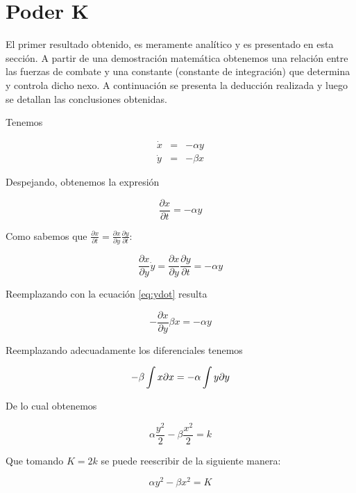 \documentclass{sig-alternate}
\begin{document}
\section{Poder K}

El primer resultado obtenido, es meramente analítico y es presentado en esta sección. A partir de una demostración matemática
obtenemos una relación entre las fuerzas de combate y una constante (constante de integración) que determina y controla dicho nexo. 
A continuación se presenta la deducción realizada y luego se detallan las conclusiones obtenidas.

Tenemos

\begin{eqnarray}
\dot{x} & = & -\alpha y\label{eq:ydot}\\
\dot{y} & = & -\beta x\end{eqnarray}


Despejando, obtenemos la expresión

\begin{equation}
\frac{\partial x}{\partial t}=-\alpha y\end{equation}


Como sabemos que $\frac{\partial x}{\partial t}=\frac{\partial x}{\partial y}\frac{\partial y}{\partial t}$:

\begin{equation}
\frac{\partial x}{\partial y}\dot{y}=\frac{\partial x}{\partial y}\frac{\partial y}{\partial t}=-\alpha y\end{equation}


Reemplazando con la ecuación \ref{eq:ydot} resulta

\begin{equation}
-\frac{\partial x}{\partial y}\beta x=-\alpha y\end{equation}


Reemplazando adecuadamente los diferenciales tenemos 

\begin{equation}
-\beta\intop x\partial x=-\alpha\int y\partial y\end{equation}


De lo cual obtenemos

\begin{equation}
\alpha\frac{y^{2}}{2}-\beta\frac{x^{2}}{2}=k\end{equation}


Que tomando $K=2k$ se puede reescribir de la siguiente manera:

\begin{equation}
\alpha y^{2}-\beta x^{2}=K\label{eq:obtenida}\end{equation}
\end{document}
